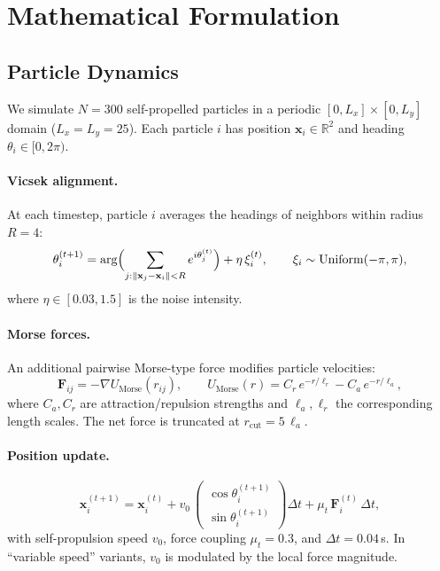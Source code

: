 \documentclass[11pt]{article}
\newcommand{\R}{\mathbb{R}}
\newcommand{\bx}{\mathbf{x}}
\begin{document}
\section{Mathematical Formulation}
\label{sec:math}

\subsection{Particle Dynamics}

We simulate $N=300$ self-propelled particles in a periodic
$[0, L_x]\times[0, L_y]$ domain ($L_x = L_y = 25$).  Each particle $i$
has position $\bx_i\in\R^2$ and heading $\theta_i\in[0,2\pi)$.

\paragraph{Vicsek alignment.}
At each timestep, particle $i$ averages the headings of neighbors within
radius $R=4$:
\begin{equation}
    \theta_i^{(t+1)} = \arg\Bigl(\sum_{j:\|\bx_j-\bx_i\|<R}
        e^{i\theta_j^{(t)}}\Bigr) + \eta\,\xi_i^{(t)},
    \qquad \xi_i \sim \mathrm{Uniform}(-\pi,\pi),
    \label{eq:vicsek}
\end{equation}
where $\eta\in[0.03, 1.5]$ is the noise intensity.

\paragraph{Morse forces.}
An additional pairwise Morse-type force modifies particle velocities:
\begin{equation}
    \mathbf{F}_{ij} = -\nabla U_{\text{Morse}}(r_{ij}),
    \qquad
    U_{\text{Morse}}(r) = C_r\, e^{-r/\ell_r} - C_a\, e^{-r/\ell_a},
    \label{eq:morse}
\end{equation}
where $C_a, C_r$ are attraction/repulsion strengths and $\ell_a, \ell_r$ the
corresponding length scales.  The net force is truncated at
$r_{\text{cut}} = 5\,\ell_a$.

\paragraph{Position update.}
\begin{equation}
    \bx_i^{(t+1)} = \bx_i^{(t)} + v_0\,
    \begin{pmatrix}\cos\theta_i^{(t+1)}\\\sin\theta_i^{(t+1)}\end{pmatrix}
    \Delta t + \mu_t\,\mathbf{F}_i^{(t)}\,\Delta t,
    \label{eq:position}
\end{equation}
with self-propulsion speed $v_0$, force coupling $\mu_t=0.3$, and
$\Delta t=0.04$\,s.  In ``variable speed'' variants, $v_0$ is modulated
by the local force magnitude.
\end{document}
